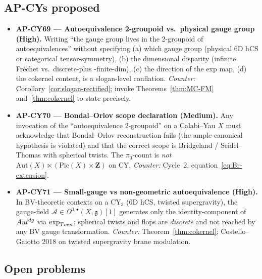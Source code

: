 \documentclass[11pt]{amsart}
\theoremstyle{definition}
\providecommand{\Aut}{\mathrm{Aut}}
\providecommand{\Autdg}{\mathrm{Aut}^{\rm dg}}
\providecommand{\Pic}{\mathrm{Pic}}
\providecommand{\fg}{\mathfrak{g}}
\providecommand{\cA}{\mathcal{A}}
\providecommand{\bZ}{\mathbf{Z}}
\begin{document}
\subsection{AP-CYs proposed}

\begin{itemize}
 \item \textbf{AP-CY69 --- Autoequivalence 2-groupoid vs.\ physical
   gauge group (High).} Writing ``the gauge group lives in the
   2-groupoid of autoequivalences'' without specifying (a) which gauge
   group (physical 6D hCS or categorical tensor-symmetry), (b) the
   dimensional disparity (infinite Fr\'echet vs.\ discrete-plus
   -finite-dim), (c) the direction of the exp map, (d) the
   cokernel content, is a slogan-level conflation.
   \emph{Counter:} Corollary~\ref{cor:slogan-rectified}; invoke
   Theorems~\ref{thm:MC-FM} and~\ref{thm:cokernel} to state
   precisely.
 \item \textbf{AP-CY70 --- Bondal--Orlov scope declaration (Medium).}
   Any invocation of the ``autoequivalence 2-groupoid'' on a
   Calabi--Yau $X$ must acknowledge that Bondal--Orlov
   reconstruction fails (the ample-canonical hypothesis is violated)
   and that the correct scope is Bridgeland / Seidel--Thomas with
   spherical twists. The $\pi_0$-count is \emph{not}
   $\Aut(X) \ltimes (\Pic(X) \times \bZ)$ on CY.
   \emph{Counter:} Cycle~2, equation~\eqref{eq:Br-extension}.
 \item \textbf{AP-CY71 --- Small-gauge vs non-geometric
   autoequivalence (High).} In BV-theoretic contexts on a CY$_3$
   (6D hCS, twisted supergravity), the gauge-field
   $\cA \in \Omega^{0,\bullet}(X, \fg)[1]$ generates only the
   identity-component of $\Autdg$ via $\exp_{\rm Toen}$; spherical
   twists and flops are \emph{discrete} and not reached by any BV
   gauge transformation.
   \emph{Counter:} Theorem~\ref{thm:cokernel};
   Costello--Gaiotto 2018 on twisted supergravity brane modulation.
\end{itemize}

\subsection{Open problems}
\end{document}
